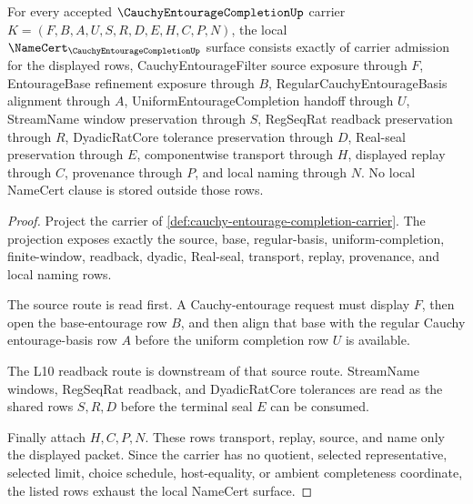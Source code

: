 \begin{theorem}
\label{thm:cauchy-entourage-completion-namecert-obligations}
For every accepted $\CauchyEntourageCompletionUp$ carrier
$K=(F,B,A,U,S,R,D,E,H,C,P,N)$, the local
$\NameCert_{\CauchyEntourageCompletionUp}$ surface consists exactly of carrier
admission for the displayed rows, CauchyEntourageFilter source exposure through
$F$, EntourageBase refinement exposure through $B$,
RegularCauchyEntourageBasis alignment through $A$, UniformEntourageCompletion
handoff through $U$, StreamName window preservation through $S$, RegSeqRat
readback preservation through $R$, DyadicRatCore tolerance preservation through
$D$, Real-seal preservation through $E$, componentwise transport through $H$,
displayed replay through $C$, provenance through $P$, and local naming through
$N$. No local NameCert clause is stored outside those rows.
\end{theorem}
\begin{proof}
Project the carrier of \autoref{def:cauchy-entourage-completion-carrier}. The
projection exposes exactly the source, base, regular-basis, uniform-completion,
finite-window, readback, dyadic, Real-seal, transport, replay, provenance, and
local naming rows.

The source route is read first. A Cauchy-entourage request must display $F$,
then open the base-entourage row $B$, and then align that base with the regular
Cauchy entourage-basis row $A$ before the uniform completion row $U$ is
available.

The L10 readback route is downstream of that source route. StreamName windows,
RegSeqRat readback, and DyadicRatCore tolerances are read as the shared rows
$S,R,D$ before the terminal seal $E$ can be consumed.

Finally attach $H,C,P,N$. These rows transport, replay, source, and name only
the displayed packet. Since the carrier has no quotient, selected
representative, selected limit, choice schedule, host-equality, or ambient
completeness coordinate, the listed rows exhaust the local NameCert surface.
\end{proof}

